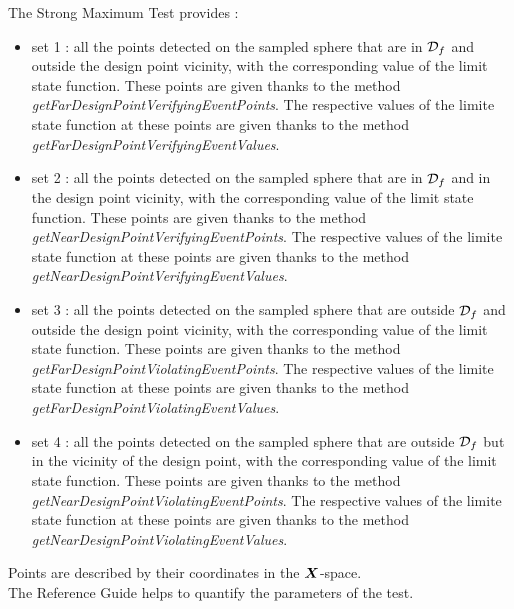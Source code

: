 The Strong Maximum Test provides :
\begin{itemize}
\item set 1 : all the points detected on the sampled sphere  that are in ${\mathcal D}_f$ and outside the design point vicinity, with the corresponding value of the limit state function. These points are given thanks to the method {\em getFarDesignPointVerifyingEventPoints}. The respective values of the limite state function at these points are given thanks to the method {\em getFarDesignPointVerifyingEventValues}.
\item set 2 : all the points detected on the sampled sphere  that are in ${\mathcal D}_f$ and in the design point vicinity, with the corresponding value of the limit state function. These points are given thanks to the method {\em getNearDesignPointVerifyingEventPoints}. The respective values of the limite state function at these points are given thanks to the method {\em getNearDesignPointVerifyingEventValues}.
\item set 3 : all the points detected on the sampled sphere  that are outside ${\mathcal D}_f$ and  outside the design point vicinity, with the corresponding value of the limit state function. These points are given thanks to the method {\em getFarDesignPointViolatingEventPoints}. The respective values of the limite state function at these points are given thanks to the method {\em getFarDesignPointViolatingEventValues}.
\item set 4 : all the points detected on the sampled sphere  that are outside ${\mathcal D}_f$ but in the vicinity of the design point, with the corresponding value of the limit state function. These points are given thanks to the method {\em getNearDesignPointViolatingEventPoints}. The respective values of the limite state function at these points are given thanks to the method {\em getNearDesignPointViolatingEventValues}.
\end{itemize}
Points are described by their coordinates  in the ${\boldsymbol{X}}$-space.\\

The Reference Guide helps to quantify the parameters of the test.\\

